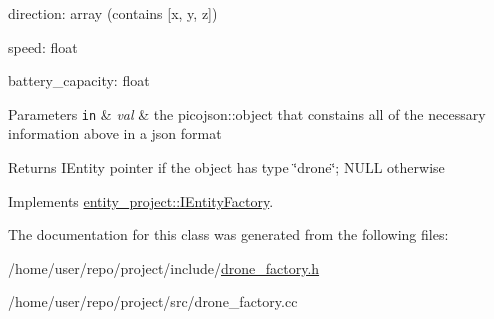 direction\+: array (contains \mbox{[}x, y, z\mbox{]})

speed\+: float

battery\+\_\+capacity\+: float 
\begin{DoxyParams}[1]{Parameters}
\mbox{\tt in}  & {\em val} & the picojson\+::object that constains all of the necessary information above in a json format \\
\hline
\end{DoxyParams}
\begin{DoxyReturn}{Returns}
I\+Entity pointer if the object has type \char`\"{}drone\char`\"{}; N\+U\+LL otherwise 
\end{DoxyReturn}


Implements \hyperlink{classentity__project_1_1IEntityFactory_ac4e8eaf4294958fef0b98bd3684704bb}{entity\+\_\+project\+::\+I\+Entity\+Factory}.



The documentation for this class was generated from the following files\+:\begin{DoxyCompactItemize}
\item 
/home/user/repo/project/include/\hyperlink{drone__factory_8h}{drone\+\_\+factory.\+h}\item 
/home/user/repo/project/src/drone\+\_\+factory.\+cc\end{DoxyCompactItemize}
